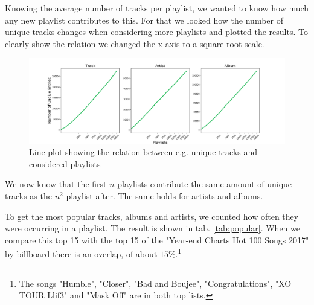 Knowing the average number of tracks per playlist, we wanted to know how much any new playlist contributes to this. For that we looked how the number of unique tracks changes when considering more playlists and plotted the results. To clearly show the relation we changed the x-axis to a square root scale.

\begin{figure}[ht]
    \centering
    \includegraphics[width=\textwidth]{fig/unique_to_playlist.pdf}
    \caption{Line plot showing the relation between e.g. unique tracks and considered playlists}
    \label{fig:unique_to_playlist}
\end{figure}

We now know that the first $n$ playlists contribute the same amount of unique tracks as the $n^2$ playlist after. The same holds for artists and albums.


To get the most popular tracks, albums and artists, we counted how often they were occurring in a playlist. The result is shown in tab. \ref{tab:popular}. When we compare this top 15 with the top 15 of the "Year-end Charts Hot 100 Songs 2017" by billboard there is an overlap, of about $15 \%$.\footnote{The songs "Humble", "Closer", "Bad and Boujee", "Congratulations", "XO TOUR Llif3" and "Mask Off" are in both top lists.}\citep{BillboardMedia}

